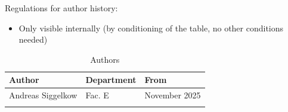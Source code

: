 Regulations for author history:
\begin{itemize}
  \item Only visible internally (by conditioning of the table, no other conditions needed)
\end{itemize}

\begin{table}[H]
\caption{Authors}
\label{tab:imemauth01a}
\centering
\begin{tabularx}{\textwidth}{|X |X |X |}
  \hline
  Author & Department & From \\
  \hline
  \hline
  Andreas Siggelkow & Fac. E & November 2025 \\
  \hline
  && \\
  \hline
\end{tabularx}
\end{table}
